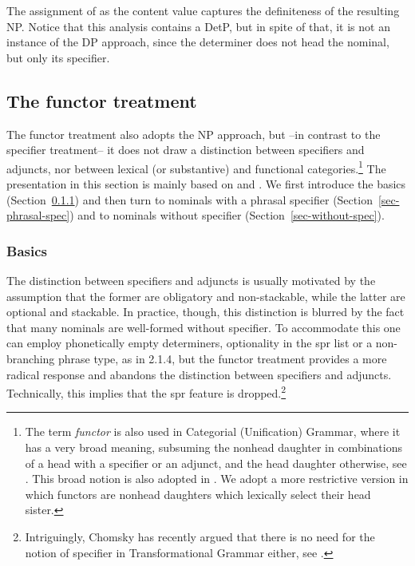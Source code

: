 \documentclass[output=paper]{langsci/langscibook}
\begin{document}
\noindent
The assignment of  as the {\sc content} value captures 
the definiteness of the resulting NP. Notice that this analysis contains a DetP, 
but in spite of that, it is not an instance of the DP approach, since the 
determiner does not head the nominal, but only its specifier. 


\subsection{The functor treatment} 


The functor treatment also adopts the NP approach, but --in contrast to the 
specifier treatment-- it does not draw a distinction between specifiers and adjuncts, 
nor between lexical (or substantive) and functional categories.\footnote{The term \emph{functor} 
is also used in Categorial (Unification) Grammar, where it has 
a very broad meaning, subsuming the nonhead daughter in combinations of a 
head with a specifier or an adjunct, and the head daughter otherwise, 
see \citet{Bouma88}. This broad notion is also adopted in 
\citet{Reape94}. We adopt a more restrictive version in which functors 
are nonhead daughters which lexically select their head sister.}  
The presentation in this section is mainly based on \citet{VanEynde06} 
and \citet{Allegranza06}. We first introduce the basics (Section~\ref{sec-basics}) and then 
turn to nominals with a phrasal specifier (Section~\ref{sec-phrasal-spec}) and to nominals without specifier (Section~\ref{sec-without-spec}).    


\subsubsection{Basics} 
\label{sec-basics}


The distinction between specifiers and adjuncts is usually motivated by 
the assumption that the former are obligatory and non-stackable, while the latter  
are optional and stackable. In practice, though, this distinction 
is blurred by the fact that many nominals are well-formed without specifier.
To accommodate this one can employ phonetically empty determiners, optionality in 
the {\sc spr} list or a non-branching phrase type, as in 2.1.4,   
but the functor treatment provides a more radical response and abandons 
the distinction between specifiers and adjuncts. 
Technically, this implies that the {\sc spr} feature is dropped.\footnote{Intriguingly,
Chomsky has recently argued that there is no need for the notion of specifier in 
Transformational Grammar either, see \citet[43]{Chomsky13}.}  
\end{document}
